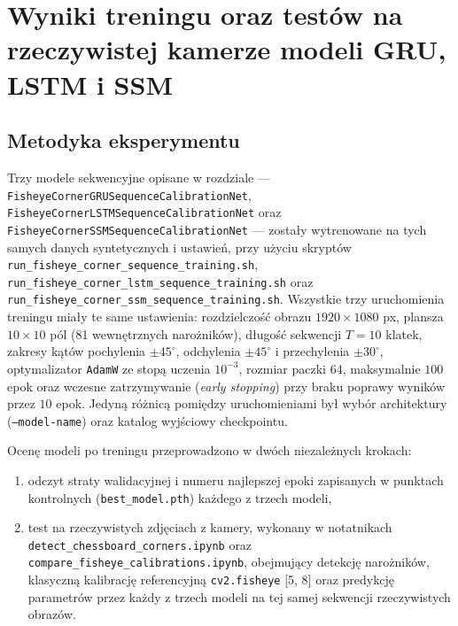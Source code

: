 
\section{Wyniki treningu oraz testów na rzeczywistej kamerze modeli GRU, LSTM i SSM}
\label{chap:wyniki-gru-lstm-ssm}

\subsection{Metodyka eksperymentu}
\label{sec:wyniki-metodyka}

Trzy modele sekwencyjne opisane w rozdziale ---
\texttt{FisheyeCornerGRUSequenceCalibrationNet},
\texttt{FisheyeCornerLSTMSequenceCalibrationNet} oraz
\texttt{FisheyeCornerSSMSequenceCalibrationNet} --- zostały wytrenowane na
tych samych danych syntetycznych i ustawień, przy użyciu skryptów
\texttt{run\_fisheye\_corner\_sequence\_training.sh},
\texttt{run\_fisheye\_corner\_lstm\_sequence\_training.sh} oraz
\texttt{run\_fisheye\_corner\_ssm\_sequence\_training.sh}. Wszystkie trzy
uruchomienia treningu miały te same ustawienia: rozdzielczość
obrazu $1920\times1080$ px, plansza $10\times10$ pól (81 wewnętrznych
narożników), długość sekwencji $T=10$ klatek, zakresy kątów pochylenia
$\pm45^\circ$, odchylenia $\pm45^\circ$ i przechylenia $\pm30^\circ$,
optymalizator \texttt{AdamW} ze stopą uczenia $10^{-3}$, rozmiar paczki $64$,
maksymalnie $100$ epok oraz wczesne zatrzymywanie (\emph{early stopping}) przy braku poprawy wyników przez $10$ epok. Jedyną różnicą pomiędzy uruchomieniami był wybór
architektury (\texttt{--model-name}) oraz katalog wyjściowy checkpointu.

Ocenę modeli po treningu przeprowadzono w dwóch niezależnych krokach:
\begin{enumerate}[leftmargin=*]
  \item odczyt straty walidacyjnej i numeru najlepszej epoki zapisanych w
        punktach kontrolnych (\texttt{best\_model.pth}) każdego z trzech
        modeli,
  \item test na rzeczywistych zdjęciach z kamery, wykonany w notatnikach
        \texttt{detect\_chessboard\_corners.ipynb} oraz
        \texttt{compare\_fisheye\_calibrations.ipynb}, obejmujący detekcję
        narożników, klasyczną kalibrację referencyjną \texttt{cv2.fisheye} [5, 8]
        oraz predykcję parametrów przez każdy z trzech modeli na tej samej
        sekwencji rzeczywistych obrazów.
\end{enumerate}

